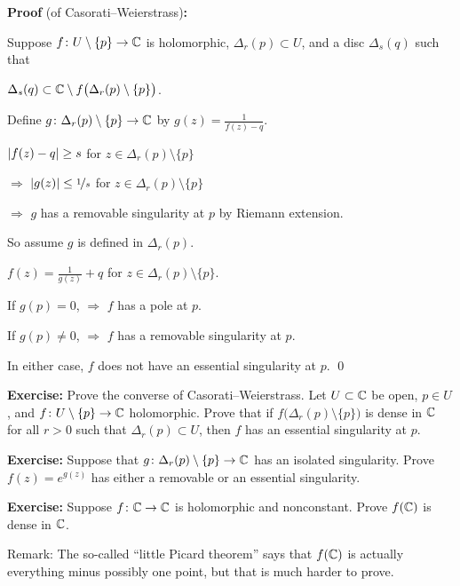 \documentclass[10pt,aspectratio=169]{beamer}
\begin{document}
\begin{frame}

\textbf{Proof} (of Casorati--Weierstrass)\textbf{:}

Suppose $f \colon U \setminus \{ p \} \to {\mathbb{C}}$ is holomorphic,
$\Delta_r(p) \subset U$, and a disc $\Delta_s(q)$ such that

\medskip

$\Delta_s(q) \subset {\mathbb{C}} \setminus f\bigl(\Delta_r(p) \setminus \{ p \} \bigr)$.

\medskip
\pause

Define $g \colon \Delta_r(p) \setminus \{p\} \to {\mathbb{C}}$ \quad
by \quad $\displaystyle
g(z) = \frac{1}{f(z) - q}$.

\medskip
\pause

$\lvert {f(z)-q} \rvert \geq s$ for $z \in \Delta_r(p) \setminus \{p\}$

\medskip
\pause

$\Rightarrow$
$\lvert {g(z)} \rvert \leq \nicefrac{1}{s}$ for $z \in \Delta_r(p) \setminus \{p\}$

\medskip
\pause
$\Rightarrow$
$g$ has a removable singularity at $p$ by Riemann extension.

\medskip
\pause

So assume $g$ is defined in $\Delta_r(p)$.

\medskip
\pause

$\displaystyle
f(z) = \frac{1}{g(z)} + q
$
\quad
for $z \in \Delta_r(p) \setminus \{ p \}$.

\medskip
\pause

If $g(p)=0$, $\Rightarrow$ $f$ has a pole at $p$.

\medskip
\pause

If $g(p) \not= 0$, $\Rightarrow$ $f$ has a removable singularity at $p$.

\medskip
\pause

In either case, $f$ does not have an essential singularity at $p$.
\qed

\end{frame}

\begin{frame}
\textbf{Exercise:}
Prove the converse of Casorati--Weierstrass.
Let $U \subset {\mathbb{C}}$ be open, $p \in U$, and
$f \colon U \setminus \{ p \} \to {\mathbb{C}}$
holomorphic.
Prove that if $f\bigl(\Delta_r(p) \setminus \{ p \} \bigr)$ is dense in ${\mathbb{C}}$
for all $r > 0$ such that $\Delta_r(p) \subset U$,
then $f$ has an essential singularity at $p$.

\medskip
\pause

\textbf{Exercise:}
Suppose that $g \colon \Delta_r(p) \setminus \{ p \} \to {\mathbb{C}}$
has an isolated singularity.  Prove $f(z) = e^{g(z)}$
has either a removable or an essential singularity.

\medskip
\pause

\textbf{Exercise:}
Suppose $f \colon {\mathbb{C}} \to {\mathbb{C}}$ is holomorphic and nonconstant.
Prove $f({\mathbb{C}})$ is dense in ${\mathbb{C}}$.
\pause

Remark: The so-called ``little Picard theorem'' says that $f({\mathbb{C}})$
is actually everything minus possibly one point,
but that is much harder to prove.
\end{frame}
\end{document}
